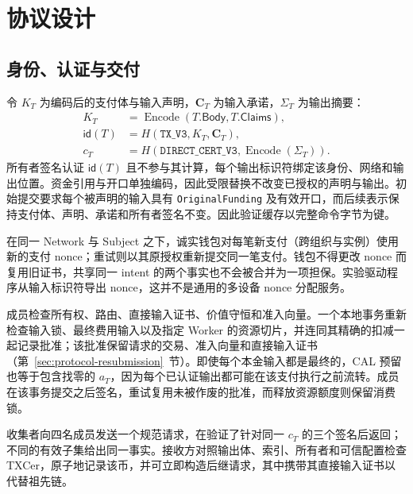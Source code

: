 
\section{协议设计}
\label{sec:protocol}

\subsection{身份、认证与交付}
\label{sec:protocol-certification}

令 $K_T$ 为编码后的支付体与输入声明，$\mathbf{C}_T$ 为输入承诺，$\Sigma_T$ 为输出摘要：
\begin{equation}
  \begin{aligned}
    K_T &= \operatorname{Encode}(T.\mathsf{Body},T.\mathsf{Claims}),\\
    \mathsf{id}(T) &= H(\texttt{TX\_V3},K_T,\mathbf{C}_T),\\
    c_T &= H(\texttt{DIRECT\_CERT\_V3},\operatorname{Encode}(\Sigma_T)).
  \end{aligned}
  \label{eq:protocol-identities}
\end{equation}
所有者签名认证 $\mathsf{id}(T)$ 且不参与其计算，每个输出标识符绑定该身份、网络和输出位置。资金引用与开口单独编码，因此受限替换不改变已授权的声明与输出。初始提交要求每个被声明的输入具有 \texttt{OriginalFunding} 及有效开口，而后续表示保持支付体、声明、承诺和所有者签名不变。因此验证缓存以完整命令字节为键。

在同一 Network 与 Subject 之下，诚实钱包对每笔新支付（跨组织与实例）使用新的支付 nonce；重试则以其原授权重新提交同一笔支付。钱包不得更改 nonce 而复用旧证书，共享同一 intent 的两个事实也不会被合并为一项担保。实验驱动程序从输入标识符导出 nonce，这并不是通用的多设备 nonce 分配服务。

成员检查所有权、路由、直接输入证书、价值守恒和准入向量。一个本地事务重新检查输入锁、最终费用输入以及指定 Worker 的资源切片，并连同其精确的扣减一起记录批准；该批准保留请求的交易、准入向量和直接输入证书（第~\ref{sec:protocol-resubmission}~节）。即使每个本金输入都是最终的，CAL 预留也等于包含找零的 $a_T$，因为每个已认证输出都可能在该支付执行之前流转。成员在该事务提交之后签名，重试复用未被作废的批准，而释放资源额度则保留消费锁。

收集者向四名成员发送一个规范请求，在验证了针对同一 $c_T$ 的三个签名后返回；不同的有效子集给出同一事实。接收方对照输出体、索引、所有者和可信配置检查 TXCer，原子地记录该币，并可立即构造后继请求，其中携带其直接输入证书以代替祖先链。

